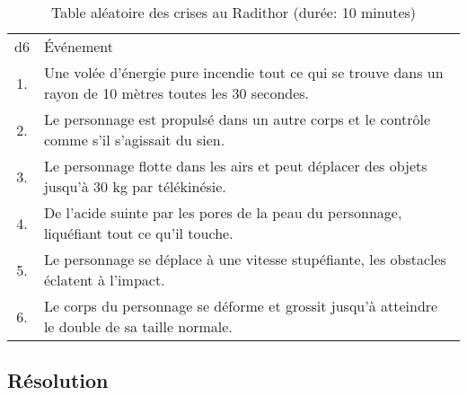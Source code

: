 \begin{table}
	\caption{Table aléatoire des crises au Radithor (durée: 10 minutes)}
	\label{table:radithor}
	\begin{tabularx}{0.9\textwidth}{cX}
	d6 & Événement\\
	1. & Une volée d'énergie pure incendie tout ce qui se trouve dans un rayon de 10 mètres toutes les 30 secondes.\\
	2. & Le personnage est propulsé dans un autre corps et le contrôle comme s'il s'agissait du sien.\\
	3. & Le personnage flotte dans les airs et peut déplacer des objets jusqu'à 30 kg par télékinésie.\\
	4. & De l'acide suinte par les pores de la peau du personnage, liquéfiant tout ce qu'il touche.\\
	5. & Le personnage se déplace à une vitesse stupéfiante, les obstacles éclatent à l'impact.\\
	6. & Le corps du personnage se déforme et grossit jusqu'à atteindre le double de sa taille normale.\\
	\end{tabularx}
\end{table}

\subsection{Résolution}

